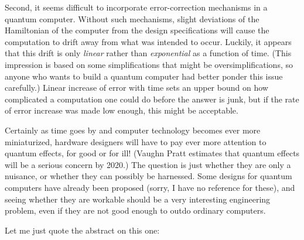\documentclass[12pt]{article}
\def\tightlist{}
\renewcommand{\texttt}[1]{%
  \begingroup
  \ttfamily
  \begingroup\lccode`~=`/\lowercase{\endgroup\def~}{/\discretionary{}{}{}}%
  \begingroup\lccode`~=`[\lowercase{\endgroup\def~}{[\discretionary{}{}{}}%
  \begingroup\lccode`~=`.\lowercase{\endgroup\def~}{.\discretionary{}{}{}}%
  \catcode`/=\active\catcode`[=\active\catcode`.=\active
  \scantokens{#1\noexpand}%
  \endgroup
}
\begin{document}
Second, it seems difficult to incorporate error-correction mechanisms in
a quantum computer. Without such mechanisms, slight deviations of the
Hamiltonian of the computer from the design specifications will cause
the computation to drift away from what was intended to occur. Luckily,
it appears that this drift is only \emph{linear} rather than
\emph{exponential} as a function of time. (This impression is based on
some simplifications that might be oversimplifications, so anyone who
wants to build a quantum computer had better ponder this issue
carefully.) Linear increase of error with time sets an upper bound on
how complicated a computation one could do before the answer is junk,
but if the rate of error increase was made low enough, this might be
acceptable.

Certainly as time goes by and computer technology becomes ever more
miniaturized, hardware designers will have to pay ever more attention to
quantum effects, for good or for ill! (Vaughn Pratt estimates that
quantum effects will be a serious concern by 2020.) The question is just
whether they are only a nuisance, or whether they can possibly be
harnessed. Some designs for quantum computers have already been proposed
(sorry, I have no reference for these), and seeing whether they are
workable should be a very interesting engineering problem, even if they
are not good enough to outdo ordinary computers.

\noindent
Let me just quote the abstract on this one:
\end{document}

